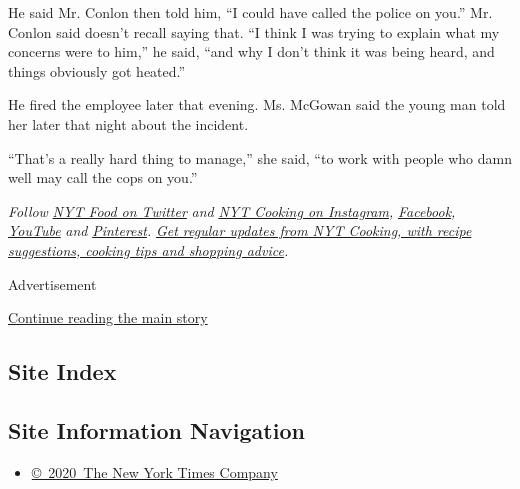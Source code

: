 He said Mr. Conlon then told him, ``I could have called the police on
you.'' Mr. Conlon said doesn't recall saying that. ``I think I was
trying to explain what my concerns were to him,'' he said, ``and why I
don't think it was being heard, and things obviously got heated.''

He fired the employee later that evening. Ms. McGowan said the young man
told her later that night about the incident.

``That's a really hard thing to manage,'' she said, ``to work with
people who damn well may call the cops on you.''

\emph{Follow} \href{https://twitter.com/nytfood}{\emph{NYT Food on
Twitter}} \emph{and}
\href{https://www.instagram.com/nytcooking/}{\emph{NYT Cooking on
Instagram}}\emph{,}
\href{https://www.facebook.com/nytcooking/}{\emph{Facebook}}\emph{,}
\href{https://www.youtube.com/nytcooking}{\emph{YouTube}} \emph{and}
\href{https://www.pinterest.com/nytcooking/}{\emph{Pinterest}}\emph{.}
\href{https://www.nytimes.com/newsletters/cooking}{\emph{Get regular
updates from NYT Cooking, with recipe suggestions, cooking tips and
shopping advice}}\emph{.}

Advertisement

\protect\hyperlink{after-bottom}{Continue reading the main story}

\hypertarget{site-index}{%
\subsection{Site Index}\label{site-index}}

\hypertarget{site-information-navigation}{%
\subsection{Site Information
Navigation}\label{site-information-navigation}}

\begin{itemize}
\tightlist
\item
  \href{https://help.nytimes.com/hc/en-us/articles/115014792127-Copyright-notice}{©~2020~The
  New York Times Company}
\end{itemize}

